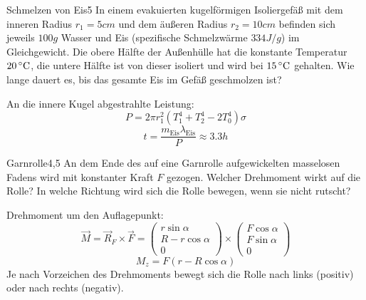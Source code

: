 \begin{problem}{Schmelzen von Eis}{5}
In einem evakuierten kugelförmigen Isoliergefäß mit dem inneren Radius $r_1 = 5 \unit{cm}$ und dem äußeren Radius $r_2 = 10 \unit{cm}$ befinden sich jeweils $100 \unit{g}$ Wasser und Eis (spezifische Schmelzwärme $334 \unit{J/g}$) im Gleichgewicht. Die obere Hälfte der Außenhülle hat die konstante Temperatur $20 \,\mathrm{^\circ C}$, die untere Hälfte ist von dieser isoliert und wird bei $15 \,\mathrm{^\circ C}$ gehalten. Wie lange dauert es, bis das gesamte Eis im Gefäß geschmolzen ist?
\begin{solution}
An die innere Kugel abgestrahlte Leistung:
\[
P = 2 \pi r_1^2 (T_1^4+T_2^4-2 T_0^4) \sigma
\]
\[
t = \frac{m_\mathrm{Eis} \lambda_\mathrm{Eis}}{P} \approx 3.3 \unit{h}
\]
\end{solution}
\end{problem}


\begin{problem}{Garnrolle}{4,5}
An dem Ende des auf eine Garnrolle aufgewickelten masselosen Fadens wird mit konstanter Kraft $F$ gezogen. Welcher Drehmoment wirkt auf die Rolle? In welche Richtung wird sich die Rolle bewegen, wenn sie nicht rutscht?
\begin{solution}
Drehmoment um den Auf\/lagepunkt:
\[
\vec M = \vec R_F \times \vec F =
\begin{pmatrix} r \sin \alpha \\ R - r \cos\alpha \\ 0 \end{pmatrix}
\times
\begin{pmatrix} F \cos \alpha \\ F \sin\alpha \\ 0 \end{pmatrix}
\]
\[
M_z = F (r - R \cos\alpha)
\]
Je nach Vorzeichen des Drehmoments bewegt sich die Rolle nach links (positiv) oder nach rechts (negativ).
\end{solution}
\end{problem}



